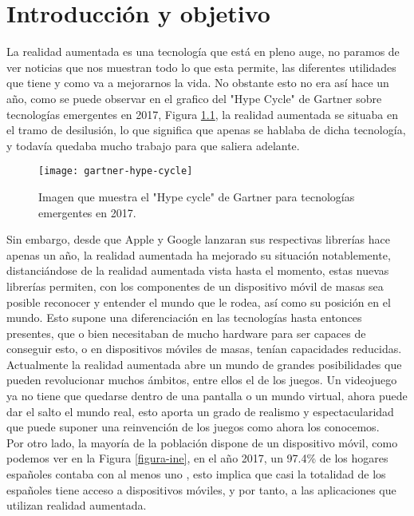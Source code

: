 \chapter{Introducción y objetivo}
\label{ch:introduccion}

La realidad aumentada es una tecnología que está en pleno auge, no paramos de ver noticias que nos muestran todo lo que esta permite, las diferentes utilidades que tiene y como va a mejorarnos la vida. No obstante esto no era así hace un año, como se puede observar en el grafico del "Hype Cycle" de Gartner sobre tecnologías emergentes en 2017, Figura \ref{figura-gartner}, la realidad aumentada se situaba en el tramo de desilusión, lo que significa que apenas se hablaba de dicha tecnología, y todavía quedaba mucho trabajo para que saliera adelante.\\

\begin{figure}[h]
  \centering
  \texttt{[image: gartner-hype-cycle]}
  \caption{Imagen que muestra el "Hype cycle" de Gartner para tecnologías emergentes en 2017.\protect\footnotemark}
  \label{figura-gartner}
\end{figure}


Sin embargo, desde que Apple y Google lanzaran sus respectivas librerías hace apenas un año, la realidad aumentada ha mejorado su situación notablemente, distanciándose de la realidad aumentada vista hasta el momento, estas nuevas librerías permiten, con los componentes de un dispositivo móvil de masas sea posible reconocer y entender el mundo que le rodea, así como su posición en el mundo. Esto supone una diferenciación en las tecnologías hasta entonces presentes, que o bien necesitaban de mucho hardware para ser capaces de conseguir esto, o en dispositivos móviles de masas, tenían capacidades reducidas.\\

Actualmente la realidad aumentada abre un mundo de grandes posibilidades que pueden revolucionar muchos ámbitos, entre ellos el de los juegos. Un videojuego ya no tiene que quedarse dentro de una pantalla o un mundo virtual, ahora puede dar el salto el mundo real, esto aporta un grado de realismo y espectacularidad que puede suponer una reinvención de los juegos como ahora los conocemos.\\

Por otro lado, la mayoría de la población dispone de un dispositivo móvil, como podemos ver en la Figura \ref{figura-ine}, en el año 2017, un 97.4\% de los hogares españoles contaba con al menos uno \cite{ine}, esto implica que casi la totalidad de los españoles tiene acceso a dispositivos móviles, y por tanto, a las aplicaciones que utilizan realidad aumentada.


